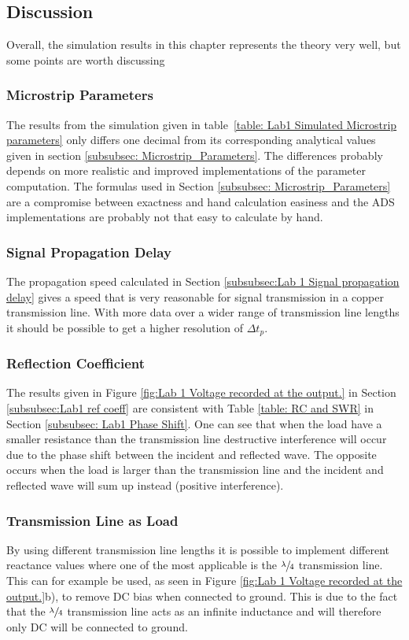 \documentclass[report.tex]{subfiles}
\begin{document}
\subsection{Discussion}
Overall, the simulation results in this chapter represents the theory very well, but some points are worth discussing
\subsubsection{Microstrip Parameters}
The results from the simulation given in table~\ref{table: Lab1 Simulated Microstrip parameters} only differs one decimal from its corresponding analytical values given in section \ref{subsubsec: Microstrip_Parameters}. The differences probably depends on more realistic and improved implementations of the parameter computation. The formulas used in Section \ref{subsubsec: Microstrip_Parameters} are a compromise between exactness and hand calculation easiness and the ADS implementations are probably not that easy to calculate by hand.
\subsubsection{Signal Propagation Delay}
The propagation speed calculated in Section \ref{subsubsec:Lab 1 Signal propagation delay} gives a speed that is very reasonable for signal transmission in a copper transmission line. With more data over a wider range of transmission line lengths it should be possible to get a higher resolution of $\Delta t_p$.
\subsubsection{Reflection Coefficient}
The results given in Figure \ref{fig:Lab 1 Voltage recorded at the output.} in Section \ref{subsubsec:Lab1 ref coeff} are consistent with Table \ref{table: RC and SWR} in Section \ref{subsubsec: Lab1 Phase Shift}. One can see that when the load have a smaller resistance than the transmission line destructive interference will occur due to the phase shift between the incident and reflected wave. The opposite occurs when the load is larger than the transmission line and the incident and reflected wave will sum up instead (positive interference).
\subsubsection{Transmission Line as Load}
By using different transmission line lengths it is possible to implement different reactance values where one of the most applicable is the $\sfrac{\lambda}{4}$ transmission line. This can for example be used, as seen in Figure \ref{fig:Lab 1 Voltage recorded at the output.}b), to remove DC bias when connected to ground. This is due to the fact that the  $\sfrac{\lambda}{4}$ transmission line acts as an infinite inductance and will therefore only DC will be connected to ground.
\end{document}
